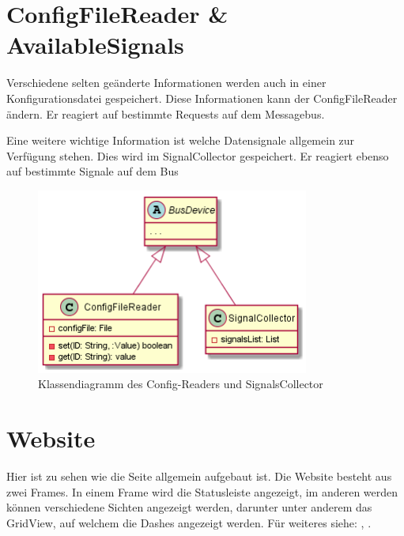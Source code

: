 \documentclass[entwurf.tex]{subfiles}
\begin{document}
  	\newpage
  	\section{ConfigFileReader \& AvailableSignals}
  		Verschiedene selten geänderte Informationen werden auch in einer Konfigurationsdatei gespeichert. Diese Informationen kann der ConfigFileReader ändern. Er reagiert auf bestimmte Requests auf dem Messagebus.
  		
  		Eine weitere wichtige Information ist welche Datensignale allgemein zur Verfügung stehen. Dies wird im SignalCollector gespeichert. Er reagiert ebenso auf bestimmte Signale auf dem Bus
  		\begin{figure}[H]
  			\begin{center}
 				\includegraphics[width=0.8\textwidth]{diagrams/Classes_Config.png}
  				\caption{Klassendiagramm des Config-Readers und SignalsCollector}
  			\end{center}
  		\end{figure}
  	

	\newpage
  	\section{Website}
  	\label{Class:Website}
		Hier ist zu sehen wie die Seite allgemein aufgebaut ist. Die Website besteht aus zwei Frames. In einem Frame wird die Statusleiste angezeigt, im anderen werden können verschiedene Sichten angezeigt werden, darunter unter anderem das GridView, auf welchem die Dashes angezeigt werden. Für weiteres siehe: , .
		
\end{document}
